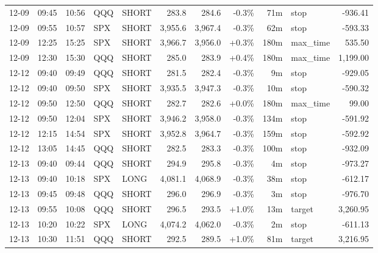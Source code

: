 \documentclass[11pt,a4paper,twoside]{article}
\begin{document}
\begin{center}
\begin{longtable}{>{\color{txtmain}}l l l l l r r r r >{\color{txtmain}}l r}
12-09 & 09:45 & 10:56 & QQQ & SHORT & 283.8 & 284.6 & \textcolor{lossred}{-0.3\%} & 71m & stop & \textcolor{lossred}{-936.41} \\
12-09 & 09:55 & 10:57 & SPX & SHORT & 3,955.6 & 3,967.4 & \textcolor{lossred}{-0.3\%} & 62m & stop & \textcolor{lossred}{-593.33} \\
12-09 & 12:25 & 15:25 & SPX & SHORT & 3,966.7 & 3,956.0 & \textcolor{wingreen}{+0.3\%} & 180m & max\_time & \textcolor{wingreen}{535.50} \\
12-09 & 12:30 & 15:30 & QQQ & SHORT & 285.0 & 283.9 & \textcolor{wingreen}{+0.4\%} & 180m & max\_time & \textcolor{wingreen}{1,199.00} \\
12-12 & 09:40 & 09:49 & QQQ & SHORT & 281.5 & 282.4 & \textcolor{lossred}{-0.3\%} & 9m & stop & \textcolor{lossred}{-929.05} \\
12-12 & 09:40 & 09:50 & SPX & SHORT & 3,935.5 & 3,947.3 & \textcolor{lossred}{-0.3\%} & 10m & stop & \textcolor{lossred}{-590.32} \\
12-12 & 09:50 & 12:50 & QQQ & SHORT & 282.7 & 282.6 & \textcolor{wingreen}{+0.0\%} & 180m & max\_time & \textcolor{wingreen}{99.00} \\
12-12 & 09:50 & 12:04 & SPX & SHORT & 3,946.2 & 3,958.0 & \textcolor{lossred}{-0.3\%} & 134m & stop & \textcolor{lossred}{-591.92} \\
12-12 & 12:15 & 14:54 & SPX & SHORT & 3,952.8 & 3,964.7 & \textcolor{lossred}{-0.3\%} & 159m & stop & \textcolor{lossred}{-592.92} \\
12-12 & 13:05 & 14:45 & QQQ & SHORT & 282.5 & 283.3 & \textcolor{lossred}{-0.3\%} & 100m & stop & \textcolor{lossred}{-932.09} \\
12-13 & 09:40 & 09:44 & QQQ & SHORT & 294.9 & 295.8 & \textcolor{lossred}{-0.3\%} & 4m & stop & \textcolor{lossred}{-973.27} \\
12-13 & 09:40 & 10:18 & SPX & LONG & 4,081.1 & 4,068.9 & \textcolor{lossred}{-0.3\%} & 38m & stop & \textcolor{lossred}{-612.17} \\
12-13 & 09:45 & 09:48 & QQQ & SHORT & 296.0 & 296.9 & \textcolor{lossred}{-0.3\%} & 3m & stop & \textcolor{lossred}{-976.70} \\
12-13 & 09:55 & 10:08 & QQQ & SHORT & 296.5 & 293.5 & \textcolor{wingreen}{+1.0\%} & 13m & target & \textcolor{wingreen}{3,260.95} \\
12-13 & 10:20 & 10:22 & SPX & LONG & 4,074.2 & 4,062.0 & \textcolor{lossred}{-0.3\%} & 2m & stop & \textcolor{lossred}{-611.13} \\
12-13 & 10:30 & 11:51 & QQQ & SHORT & 292.5 & 289.5 & \textcolor{wingreen}{+1.0\%} & 81m & target & \textcolor{wingreen}{3,216.95} \\

\end{longtable}
\end{center}
\end{document}
